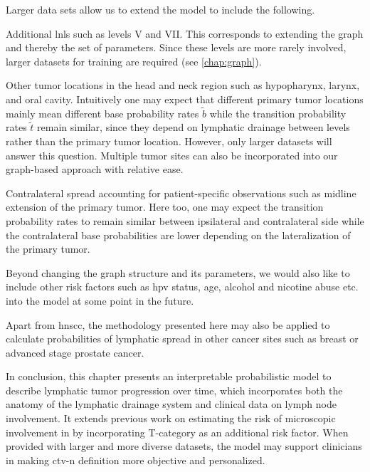 \documentclass[\relativeRoot/main.tex]{subfiles}
\begin{document}
Larger data sets allow us to extend the model to include the following.
\begin{enumerate*}[label={(\arabic*)}]
    \item Additional \glspl{lnl} such as levels V and VII. This corresponds to extending the graph and thereby the set of parameters. Since these levels are more rarely involved, larger datasets for training are required (see \cref{chap:graph}).
    \item Other tumor locations in the head and neck region such as hypopharynx, larynx, and oral cavity. Intuitively one may expect that different primary tumor locations mainly mean different base probability rates $\tilde{b}$ while the transition probability rates $\tilde{t}$ remain similar, since they depend on lymphatic drainage between levels rather than the primary tumor location. However, only larger datasets will answer this question. Multiple tumor sites can also be incorporated into our graph-based approach with relative ease.
    \item Contralateral spread accounting for patient-specific observations such as midline extension of the primary tumor. Here too, one may expect the transition probability rates to remain similar between ipsilateral and contralateral side while the contralateral base probabilities are lower depending on the lateralization of the primary tumor.
    \item Beyond changing the graph structure and its parameters, we would also like to include other risk factors such as \gls{hpv} status, age, alcohol and nicotine abuse etc. into the model at some point in the future.
    \item Apart from \gls{hnscc}, the methodology presented here may also be applied to calculate probabilities of lymphatic spread in other cancer sites such as breast or advanced stage prostate cancer.
\end{enumerate*}

In conclusion, this chapter presents an interpretable probabilistic model to describe lymphatic tumor progression over time, which incorporates both the anatomy of the lymphatic drainage system and clinical data on lymph node involvement. It extends previous work on estimating the risk of microscopic involvement in  by incorporating T-category as an additional risk factor. When provided with larger and more diverse datasets, the model may support clinicians in making \gls{ctv-n} definition more objective and personalized.
\end{document}
